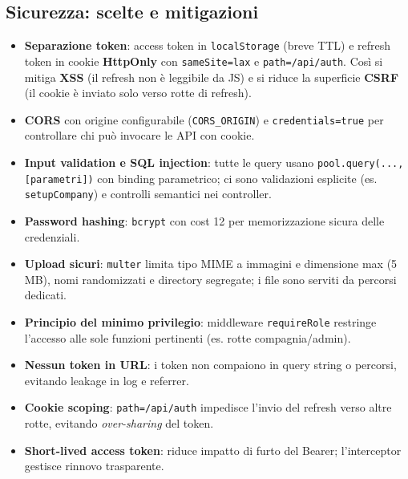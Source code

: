 \documentclass[12pt,a4paper]{article}
\begin{document}
\subsection{Sicurezza: scelte e mitigazioni}
\begin{itemize}[noitemsep]
	\item \textbf{Separazione token}: access token in \texttt{localStorage} (breve TTL) e refresh token in cookie \textbf{HttpOnly} con \texttt{sameSite=lax} e \texttt{path=/api/auth}. Così si mitiga \textbf{XSS} (il refresh non è leggibile da JS) e si riduce la superficie \textbf{CSRF} (il cookie è inviato solo verso rotte di refresh).
	\item \textbf{CORS} con origine configurabile (\texttt{CORS\_ORIGIN}) e \texttt{credentials=true} per controllare chi può invocare le API con cookie.
	\item \textbf{Input validation e SQL injection}: tutte le query usano \texttt{pool.query(..., [parametri])} con binding parametrico; ci sono validazioni esplicite (es. \texttt{setupCompany}) e controlli semantici nei controller.
	\item \textbf{Password hashing}: \texttt{bcrypt} con cost 12 per memorizzazione sicura delle credenziali.
	\item \textbf{Upload sicuri}: \texttt{multer} limita tipo MIME a immagini e dimensione max (5 MB), nomi randomizzati e directory segregate; i file sono serviti da percorsi dedicati.
	\item \textbf{Principio del minimo privilegio}: middleware \texttt{requireRole} restringe l'accesso alle sole funzioni pertinenti (es. rotte compagnia/admin).
	\item \textbf{Nessun token in URL}: i token non compaiono in query string o percorsi, evitando leakage in log e referrer.
	\item \textbf{Cookie scoping}: \texttt{path=/api/auth} impedisce l'invio del refresh verso altre rotte, evitando \emph{over-sharing} del token.
	\item \textbf{Short-lived access token}: riduce impatto di furto del Bearer; l'interceptor gestisce rinnovo trasparente.
\end{itemize}
\end{document}
